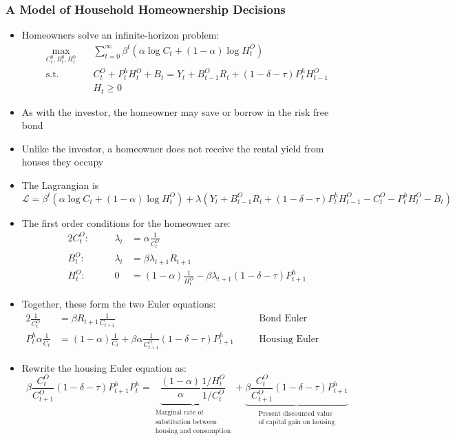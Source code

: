 \documentclass[a4paper,twoside]{article}
\newif\IfInSansMode
\numberwithin{equation}{section}
\numberwithin{figure}{section}
\begin{document}
\subsubsection{A Model of Household Homeownership Decisions}
	\begin{itemize}
		\item Homeowners solve an infinite-horizon problem:
		\begin{align*}
			\max_{C_t^0,B_t^0,H_t^0}\quad &\sum_{t=0}^{\infty} \beta^t (\alpha\log C_t+(1-\alpha)\log H_t^O) \\
			\text{s.t.}\quad &C_t^O + P_t^h H_t^O + B_t = Y_t + B_{t-1}^O R_t + (1-\delta-\tau)P_t^h H_{t-1}^O\\
			& H_t \geq 0
		\end{align*}
		\item As with the investor, the homeowner may \textcolor{myblue}{save} or \textcolor{myblue}{borrow} in the risk free bond
		\item Unlike the investor, a homeowner does not receive the rental yield from houses they occupy
		\item The Lagrangian is
		\[
			\mathcal{L} = \beta^t (\alpha\log C_t+(1-\alpha)\log H_t^O) + \lambda(Y_t + B_{t-1}^O R_t + (1-\delta-\tau)P_t^h H_{t-1}^O - C_t^O - P_t^h H_t^O - B_t)
		\]
		\item The first order conditions for the homeowner are:
		\begin{alignat*}{2}
			C_t^O:\quad && \lambda_t&= \alpha\frac{1}{C_t^O}\\
			B_t^O:\quad && \lambda_t&= \beta\lambda_{t+1}R_{t+1}\\
			H_t^O:\quad && 0&= (1-\alpha)\frac{1}{H_t^O}-\beta\lambda_{t+1}(1-\delta-\tau)P_{t+1}^h
		\end{alignat*}
		\item Together, these form the two Euler equations:
		\begin{alignat*}{2}
			\frac{1}{C_t^O} &= \beta R_{t+1} \frac{1}{C_{t+1}} &&\text{Bond Euler Equation}\\
			P_t^h \alpha\frac{1}{C_t} &= (1-\alpha)\frac{1}{C_t} + \beta\alpha\frac{1}{C_{t+1}^O} (1-\delta-\tau)P_{t+1}^h \quad &&\text{Housing Euler Equation}
		\end{alignat*}
		\item Rewrite the housing Euler equation as:
		\[\beta\frac{C_t^O}{C_{t+1}^O}(1-\delta-\tau)P_{t+1}^h
			P_t^h = \underbrace{\frac{(1-\alpha)}{\alpha}\frac{1/H_t^O}{1/C_t^O}}_{\substack{\text{Marginal rate of}\\\text{substitution between}\\\text{housing and consumption}}} + \underbrace{\beta\frac{C_t^O}{C_{t+1}^O} (1-\delta-\tau)P_{t+1}^h}_{\substack{\text{Present discounted value}\\\text{of capital gain on housing}}}
\]
\end{itemize}
\end{document}
